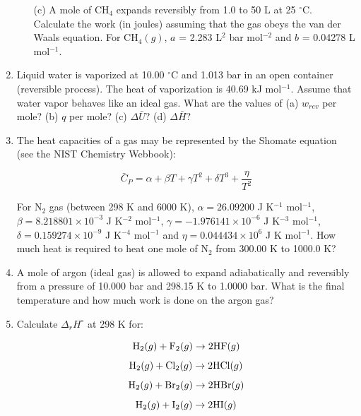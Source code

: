 \begin{enumerate}
\begin{itemize}
\item[(c)] A mole of CH$_4$ expands reversibly from 1.0 to 50 L at 25 $^\circ$C. Calculate the work (in joules) assuming that the gas obeys the van der Waals equation. For CH$_4(g)$, $a$ = 2.283 L$^2$ bar mol$^{-2}$ and $b$ = 0.04278 L mol$^{-1}$.

\end{itemize}


\item Liquid water is vaporized at 10.00 $^\circ$C and 1.013 bar in an open container (reversible process). The heat of vaporization is 40.69 kJ mol$^{-1}$. Assume that water vapor behaves like an ideal gas. What are the values of (a) $w_{rev}$ per mole? (b) $q$ per mole? (c) $\Delta \bar{U}$? (d) $\Delta \bar{H}$?


\item The heat capacities of a gas may be represented by the Shomate equation (see the NIST Chemistry Webbook):

$$\bar{C}_P = \alpha + \beta T + \gamma T^2 + \delta T^3 + \frac{\eta}{T^2}$$

For N$_2$ gas (between 298 K and 6000 K), $\alpha = 26.09200$ J K$^{-1}$ mol$^{-1}$, $\beta = 8.218801\times 10^{-3}$ J K$^{-2}$ mol$^{-1}$, $\gamma = -1.976141\times 10^{-6}$ J K$^{-3}$ mol$^{-1}$, $\delta = 0.159274\times 10^{-9}$ J K$^{-4}$ mol$^{-1}$ and $\eta = 0.044434\times 10^{6}$ J K mol$^{-1}$. How much heat is required to heat one mole of N$_2$ from 300.00 K to 1000.0 K?


\item A mole of argon (ideal gas) is allowed to expand adiabatically and reversibly from a pressure of 10.000 bar and 298.15 K to 1.0000 bar. What is the final temperature and how much work is done on the argon gas?


\item Calculate $\Delta_rH^\circ$ at 298 K for:

$$\textnormal{H}_2(g) + \textnormal{F}_2(g) \rightarrow 2\textnormal{HF}(g)$$
$$\textnormal{H}_2(g) + \textnormal{Cl}_2(g) \rightarrow 2\textnormal{HCl}(g)$$
$$\textnormal{H}_2(g) + \textnormal{Br}_2(g) \rightarrow 2\textnormal{HBr}(g)$$
$$\textnormal{H}_2(g) + \textnormal{I}_2(g) \rightarrow 2\textnormal{HI}(g)$$


\end{enumerate}
